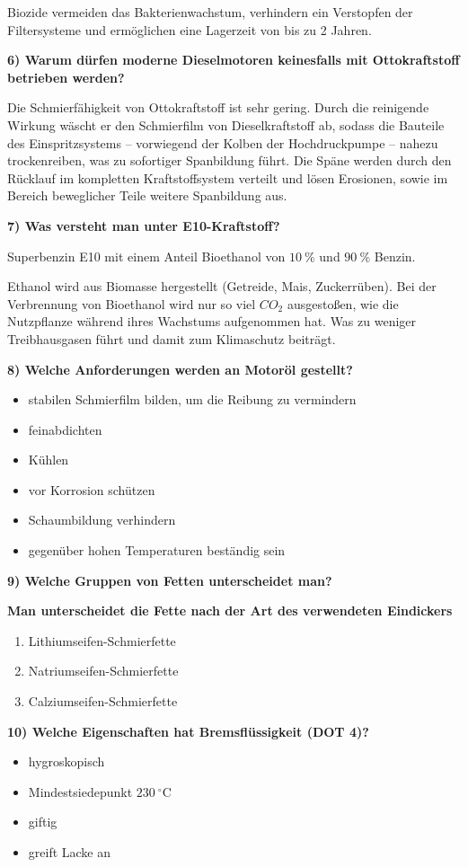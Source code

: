 Biozide vermeiden das Bakterienwachstum, verhindern ein Verstopfen der
Filtersysteme und ermöglichen eine Lagerzeit von bis zu 2 Jahren.

\textbf{6) Warum dürfen moderne Dieselmotoren keinesfalls mit
Ottokraftstoff betrieben werden?}

Die Schmierfähigkeit von Ottokraftstoff ist sehr gering. Durch die
reinigende Wirkung wäscht er den Schmierfilm von Dieselkraftstoff ab,
sodass die Bauteile des Einspritzsystems -- vorwiegend der Kolben der
Hochdruckpumpe -- nahezu trockenreiben, was zu sofortiger Spanbildung
führt. Die Späne werden durch den Rücklauf im kompletten
Kraftstoffsystem verteilt und lösen Erosionen, sowie im Bereich
beweglicher Teile weitere Spanbildung aus.

\textbf{7) Was versteht man unter E10-Kraftstoff?}

Superbenzin E10 mit einem Anteil Bioethanol von $10~\%$ und $90~\%$
Benzin.

Ethanol wird aus Biomasse hergestellt (Getreide, Mais, Zuckerrüben). Bei
der Verbrennung von Bioethanol wird nur so viel $CO_2$ ausgestoßen,
wie die Nutzpflanze während ihres Wachstums aufgenommen hat. Was zu
weniger Treibhausgasen führt und damit zum Klimaschutz beiträgt.

\textbf{8) Welche Anforderungen werden an Motoröl gestellt?}

\begin{itemize}
\item
  stabilen Schmierfilm bilden, um die Reibung zu vermindern
\item
  feinabdichten
\item
  Kühlen
\item
  vor Korrosion schützen
\item
  Schaumbildung verhindern
\item
  gegenüber hohen Temperaturen beständig sein
\end{itemize}

\textbf{9) Welche Gruppen von Fetten unterscheidet man?}

\textbf{Man unterscheidet die Fette nach der Art des verwendeten
Eindickers}

\begin{enumerate}
\item
  Lithiumseifen-Schmierfette
\item
  Natriumseifen-Schmierfette
\item
  Calziumseifen-Schmierfette
\end{enumerate}

\textbf{10) Welche Eigenschaften hat Bremsflüssigkeit (DOT 4)?}

\begin{itemize}
\item
  hygroskopisch
\item
  Mindestsiedepunkt $230~^\circ\text{C}$
\item
  giftig
\item
  greift Lacke an
\end{itemize}
